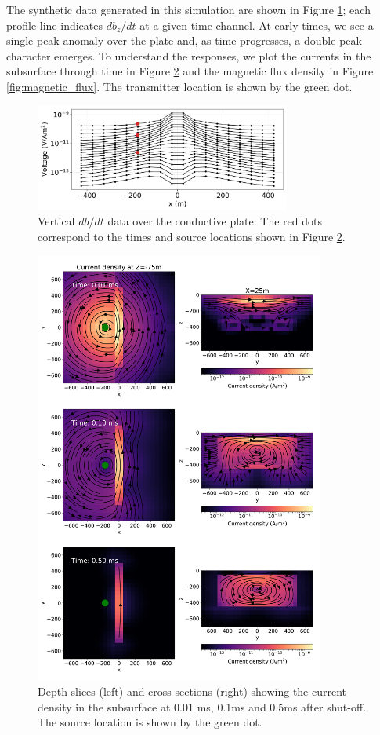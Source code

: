 \documentclass[paper]{geophysics}
\begin{document}
The synthetic data generated in this simulation are shown in Figure \ref{fig:data}; each profile line indicates $db_z/dt$ at a given time channel. At early times, we see a single peak anomaly over the plate and, as time progresses, a double-peak character emerges. To understand the responses, we plot the currents in the subsurface through time in Figure \ref{fig:currents} and the magnetic flux density in Figure \ref{fig:magnetic_flux}. The transmitter location is shown by the green dot.

\begin{figure}[!htb]
  \centering
  \includegraphics[width=0.75\textwidth]{figures/data.png}
  \caption{Vertical $db/dt$ data over the conductive plate. The red dots correspond to the times and source locations shown in Figure \ref{fig:currents}.}
  \label{fig:data}
\end{figure}

\begin{figure}[!htb]
  \centering
  \includegraphics[width=0.85\textwidth]{figures/currents.png}
  \caption{Depth slices (left) and cross-sections (right) showing the current density in the subsurface at 0.01 ms, 0.1ms and 0.5ms after shut-off. The source location is shown by the green dot.}
  \label{fig:currents}
\end{figure}
\end{document}
